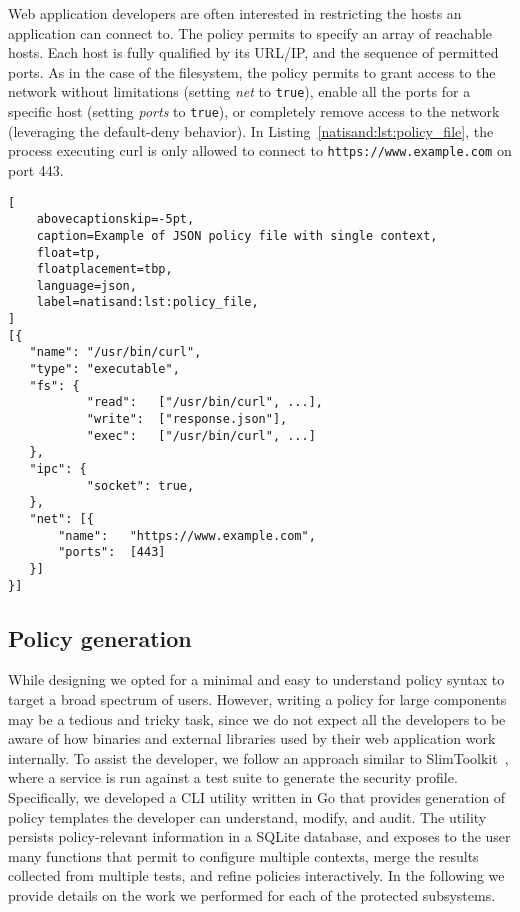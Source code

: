 Web application developers are often interested in restricting the
hosts an application can connect to. The policy permits to
specify an array of reachable hosts. Each host is fully qualified by
its URL/IP, and the sequence of permitted ports. As in the case of the
filesystem, the policy permits to grant access to the network without
limitations (setting {\em net} to {\tt true}), enable all the ports
for a specific host (setting {\em ports} to {\tt true}), or completely
remove access to the network (leveraging the default-deny
behavior). In Listing~\ref{natisand:lst:policy_file}, the process executing
curl is only allowed to connect to {\tt https://www.example.com} on
port 443.

\begin{lstlisting}[
    abovecaptionskip=-5pt,
    caption=Example of JSON policy file with single context,
    float=tp,
    floatplacement=tbp,
    language=json,
    label=natisand:lst:policy_file,
]
[{
   "name": "/usr/bin/curl",
   "type": "executable",
   "fs": {
           "read":   ["/usr/bin/curl", ...],
           "write":  ["response.json"],
           "exec":   ["/usr/bin/curl", ...]
   },
   "ipc": {
           "socket": true,
   },
   "net": [{
	   "name":   "https://www.example.com",
	   "ports":  [443]
   }]
}]
\end{lstlisting}


\subsection{Policy generation}
\label{sect:sci-ffi-policy-generation}

While designing \pap we opted for a minimal and easy to understand
policy syntax to target a broad spectrum of users. However, writing a
policy for large components may be a tedious and tricky task, since we
do not expect all the developers to be aware of how binaries and
external libraries used by their web application work internally. To
assist the developer, we follow an approach similar to
SlimToolkit~\cite{slimtoolkit}, where a service is run against a test
suite to generate the security profile.
Specifically, we developed a CLI utility written in Go that provides
generation of policy templates the developer can understand,
modify, and audit. The utility persists policy-relevant information
in a SQLite database, and exposes to the user many functions that
permit to configure multiple contexts, merge the results collected
from multiple tests, and refine policies interactively.
In the following we provide details on
the work we performed for each of the protected subsystems.

